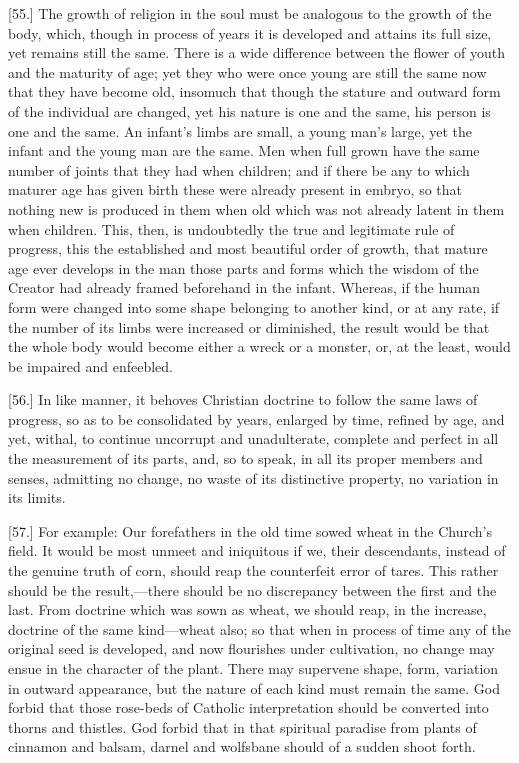 [55.] The growth of religion in the soul must be analogous to the growth of the body, which, though in process of years it is developed and attains its full size, yet remains still the same. There is a wide difference between the flower of youth and the maturity of age; yet they who were once young are still the same now that they have become old, insomuch that though the stature and outward form of the individual are changed, yet his nature is one and the same, his person is one and the same. An infant’s limbs are small, a young man’s large, yet the infant and the young man are the same. Men when full grown have the same number of joints that they had when children; and if there be any to which maturer age has given birth these were already present in embryo, so that nothing new is produced in them when old which was not already latent in them when children. This, then, is undoubtedly the true and legitimate rule of progress, this the established and most beautiful order of growth, that mature age ever develops in the man those parts and forms which the wisdom of the Creator had already framed beforehand in the infant. Whereas, if the human form were changed into some shape belonging to another kind, or at any rate, if the number of its limbs were increased or diminished, the result would be that the whole body would become either a wreck or a monster, or, at the least, would be impaired and enfeebled.

[56.] In like manner, it behoves Christian doctrine to follow the same laws of progress, so as to be consolidated by years, enlarged by time, refined by age, and yet, withal, to continue uncorrupt and unadulterate, complete and perfect in all the measurement of its parts, and, so to speak, in all its proper members and senses, admitting no change, no waste of its distinctive property, no variation in its limits.

[57.] For example: Our forefathers in the old time sowed wheat in the Church’s field. It would be most unmeet and iniquitous if we, their descendants, instead of the genuine truth of corn, should reap the counterfeit error of tares. This rather should be the result,—there should be no discrepancy between the first and the last. From doctrine which was sown as wheat, we should reap, in the increase, doctrine of the same kind—wheat also; so that when in process of time any of the original seed is developed, and now flourishes under cultivation, no change may ensue in the character of the plant. There may supervene shape, form, variation in outward appearance, but the nature of each kind must remain the same. God forbid that those rose-beds of Catholic interpretation should be converted into thorns and thistles. God forbid that in that spiritual paradise from plants of cinnamon and balsam, darnel and wolfsbane should of a sudden shoot forth.

